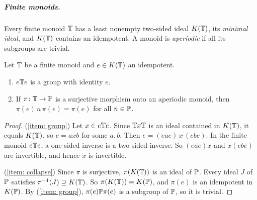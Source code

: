 \subparagraph*{Finite monoids.}
Every finite monoid $\mathbb{T}$ has a least nonempty two-sided ideal $K(\mathbb{T})$, its \emph{minimal ideal}, and $K(\mathbb{T})$ contains an idempotent.
A monoid is \emph{aperiodic} if all its subgroups are trivial.

\begin{lemma}\label{lemma: minimal ideal}
  Let $\mathbb{T}$ be a finite monoid and $e \in K(\mathbb{T})$ an idempotent.
  \begin{enumerate}
    \item\label{item: group} $e \mathbb{T} e$ is a group with identity $e$.
    \item\label{item: collapse} If $\pi \colon \mathbb{T} \to \mathbb{P}$ is a surjective morphism onto an aperiodic monoid, then $\pi(e)\, n\, \pi(e) = \pi(e)$ for all $n \in \mathbb{P}$.
  \end{enumerate}
\end{lemma}
\begin{proof}
  (\ref{item: group})
  Let $x \in e\mathbb{T} e$.
  Since $\mathbb{T} x \mathbb{T}$ is an ideal contained in $K(\mathbb{T})$, it equals $K(\mathbb{T})$, so $e = a x b$ for some $a, b$.
  Then $e = (eae)\, x\, (ebe)$.
  In the finite monoid $e\mathbb{T} e$, a one-sided inverse is a two-sided inverse.
  So $(eae)x$ and $x(ebe)$ are invertible, and hence $x$ is invertible.

  (\ref{item: collapse})
  Since $\pi$ is surjective, $\pi(K(\mathbb{T}))$ is an ideal of $\mathbb{P}$.
  Every ideal $J$ of $\mathbb{P}$ satisfies $\pi^{-1}(J) \supseteq K(\mathbb{T})$.
  So $\pi(K(\mathbb{T})) = K(\mathbb{P})$, and $\pi(e)$ is an idempotent in $K(\mathbb{P})$.
  By (\ref{item: group}), $\pi(e)\mathbb{P}\pi(e)$ is a subgroup of $\mathbb{P}$, so it is trivial.
\end{proof}
